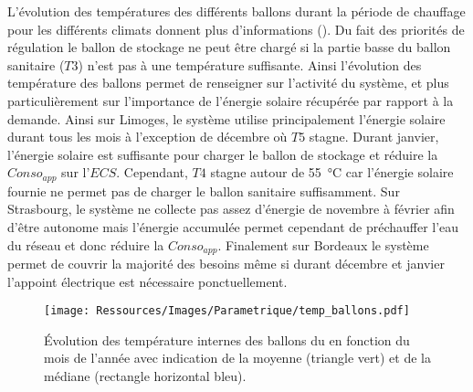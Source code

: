 L’évolution des températures des différents ballons durant la période de chauffage pour
les différents climats donnent plus d’informations (). Du
fait des priorités de régulation le ballon de stockage ne peut être chargé si la partie
basse du ballon sanitaire ($T3$) n’est pas à une température suffisante. Ainsi l’évolution
des température des ballons permet de renseigner sur l’activité du système, et plus
particulièrement sur l’importance de l’énergie solaire récupérée par rapport à la demande.
Ainsi sur Limoges, le système utilise principalement l’énergie solaire durant tous les
mois à l’exception de décembre où $T5$ stagne. Durant janvier, l’énergie solaire est
suffisante pour charger le ballon de stockage et réduire la $Conso_{app}$ sur
l’$ECS$. Cependant, $T4$ stagne autour de \SI{55}{\celsius} car l’énergie solaire fournie
ne permet pas de charger le ballon sanitaire suffisamment. Sur Strasbourg, le système ne
collecte pas assez d’énergie de novembre à février afin d’être autonome mais l’énergie
accumulée permet cependant de préchauffer l’eau du réseau et donc réduire la
$Conso_{app}$. Finalement sur Bordeaux le système permet de couvrir la majorité des besoins
même si durant décembre et janvier l’appoint électrique est nécessaire ponctuellement.

\begin{figure}
    \centering
    \texttt{[image: Ressources/Images/Parametrique/temp\_ballons.pdf]}
    \caption[Évolution des température internes des ballons du ]
            {Évolution des température internes des ballons du  en fonction du mois
             de l’année avec indication de la moyenne (triangle vert) et
             de la médiane (rectangle horizontal bleu).}
    \label{fig:temp_ballon_mensuel}
\end{figure}


